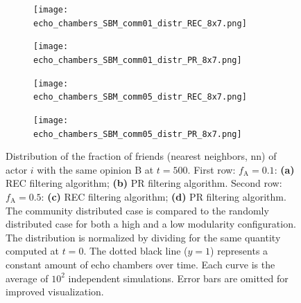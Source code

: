 \documentclass[11 pt , letterpaper , twoside , openright]{book}
\begin{document}
\begin{figure}[H]
  \begin{subfigure}[b]{0.49\textwidth}
    \caption{}
  	\texttt{[image: echo\_chambers\_SBM\_comm01\_distr\_REC\_8x7.png]}
    \label{rec_comm_echo}
  \end{subfigure}
  \begin{subfigure}[b]{0.49\textwidth}
    \caption{}
  	\texttt{[image: echo\_chambers\_SBM\_comm01\_distr\_PR\_8x7.png]}
    \label{pr_comm_echo}
  \end{subfigure}
  \begin{subfigure}[b]{0.49\textwidth}
    \caption{}
  	\texttt{[image: echo\_chambers\_SBM\_comm05\_distr\_REC\_8x7.png]}
    \label{rec_comm05_echo}
  \end{subfigure}
  \begin{subfigure}[b]{0.49\textwidth}
    \caption{}
  	\texttt{[image: echo\_chambers\_SBM\_comm05\_distr\_PR\_8x7.png]}
    \label{pr_comm05_echo}
  \end{subfigure}
  \captionsetup{format=plain}
  \caption[Distribution of the fraction of friends (nearest neighbors, nn) of actor $i$ with the same opinion B at $t = 500$. $10 \%$ and $50 \%$ of the communities is given a single opinion, opinion A, while the remaining communities get an initial $50/50$ opinion distribution. The community distributed case is compared to the corresponding randomly distributed case ($55/45$ or $75/25$) for both a high modularity and a low modularity configuration. Results for the REC and PR filtering algorithms.]{Distribution of the fraction of friends (nearest neighbors, nn) of actor $i$ with the same opinion B at $t = 500$. First row: $f_\text{A} = 0.1$: \textbf{(a)} REC filtering algorithm; \textbf{(b)} PR filtering algorithm. Second row: $f_\text{A} = 0.5$: \textbf{(c)} REC filtering algorithm; \textbf{(d)} PR filtering algorithm. The community distributed case is compared to the randomly distributed case for both a high and a low modularity configuration. The distribution is normalized by dividing for the same quantity computed at $t=0$. The dotted black line ($y=1$) represents a constant amount of echo chambers over time. Each curve is the average of $10^2$ independent simulations. Error bars are omitted for improved visualization.}
\label{echo_01_commOp0_other_50-50}
\end{figure}
\noindent
\end{document}
